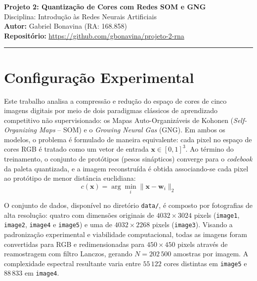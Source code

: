 \documentclass[11pt,a4paper]{article}
\begin{document}
\begin{center}
    {\LARGE \textbf{Projeto 2: Quantização de Cores com Redes SOM e GNG}} \\[0.35em]
    {\large Disciplina: Introdução às Redes Neurais Artificiais} \\[0.3em]
    \textbf{Autor:} Gabriel Bonavina (RA: 168.858)\\[0.2em]
    \textbf{Repositório:} \url{https://github.com/gbonavina/projeto-2-rna}
\end{center}
\vspace{-0.5em}
\hrule
\vspace{0.8em}

\section*{Configuração Experimental}

Este trabalho analisa a compressão e redução do espaço de cores de cinco imagens digitais por meio de dois paradigmas clássicos de aprendizado competitivo não supervisionado: os Mapas Auto-Organizáveis de Kohonen (\textit{Self-Organizing Maps} -- SOM) e o \textit{Growing Neural Gas} (GNG). Em ambos os modelos, o problema é formulado de maneira equivalente: cada pixel no espaço de cores RGB é tratado como um vetor de entrada $\mathbf{x} \in [0, 1]^3$. Ao término do treinamento, o conjunto de protótipos (pesos sinápticos) converge para o \textit{codebook} da paleta quantizada, e a imagem reconstruída é obtida associando-se cada pixel ao protótipo de menor distância euclidiana:
\begin{equation}
    c(\mathbf{x}) = \arg\min_{i} \|\mathbf{x} - \mathbf{w}_i\|_2
\end{equation}

O conjunto de dados, disponível no diretório \texttt{data/}, é composto por fotografias de alta resolução: quatro com dimensões originais de $4032 \times 3024$ pixels (\texttt{image1}, \texttt{image2}, \texttt{image4} e \texttt{image5}) e uma de $4032 \times 2268$ pixels (\texttt{image3}). Visando a padronização experimental e viabilidade computacional, todas as imagens foram convertidas para RGB e redimensionadas para $450 \times 450$ pixels através de reamostragem com filtro Lanczos, gerando $N = 202\,500$ amostras por imagem. A complexidade espectral resultante varia entre $55\,122$ cores distintas em \texttt{image5} e $88\,833$ em \texttt{image4}.
\end{document}
